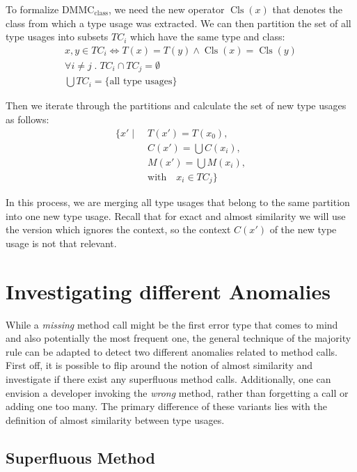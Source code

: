 To formalize $\text{DMMC}_{\text{class}}$, we need the new operator $\operatorname{Cls}(x)$ that denotes the class from which a type usage was extracted.
We can then partition the set of all type usages into subsets $TC_i$ which have the same type and class:
\begin{gather*}
    x, y \in TC_i \iff T(x) = T(y) \land \operatorname{Cls}(x) = \operatorname{Cls}(y) \\
    \forall i \ne j \;.\; TC_i \cap TC_j = \emptyset \\
    \bigcup TC_i = \{ \text{all type usages} \}
\end{gather*}

Then we iterate through the partitions and calculate the set of new type usages as follows:
\begin{align*}
    \{ x' \mid \;  & T(x') = T(x_0),\\
                & C(x') = \bigcup{C(x_i)},\\
                & M(x') = \bigcup{M(x_i)},\\
                & \text{with} \quad x_i \in TC_j \}
\end{align*}

In this process, we are merging all type usages that belong to the same partition into one new type usage.
Recall that for exact and almost similarity we will use the version which ignores the context, so the context $C(x')$ of the new type usage is not that relevant.

\section{Investigating different Anomalies}

While a \emph{missing} method call might be the first error type that comes to mind and also potentially the most frequent one, the general technique of the majority rule can be adapted to detect two different anomalies related to method calls.
First off, it is possible to flip around the notion of almost similarity and investigate if there exist any superfluous method calls.
Additionally, one can envision a developer invoking the \emph{wrong} method, rather than forgetting a call or adding one too many.
The primary difference of these variants lies with the definition of almost similarity between type usages.

\subsection{Superfluous Method}


